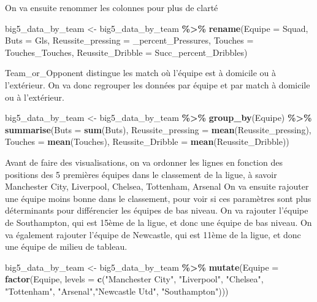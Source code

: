 \documentclass[
]{article}
\newenvironment{Shaded}{\begin{snugshade}}{\end{snugshade}}
\newcommand{\AttributeTok}[1]{\textcolor[rgb]{0.13,0.29,0.53}{#1}}
\newcommand{\FunctionTok}[1]{\textcolor[rgb]{0.13,0.29,0.53}{\textbf{#1}}}
\newcommand{\NormalTok}[1]{#1}
\newcommand{\OtherTok}[1]{\textcolor[rgb]{0.56,0.35,0.01}{#1}}
\newcommand{\SpecialCharTok}[1]{\textcolor[rgb]{0.81,0.36,0.00}{\textbf{#1}}}
\newcommand{\StringTok}[1]{\textcolor[rgb]{0.31,0.60,0.02}{#1}}
\begin{document}
On va ensuite renommer les colonnes pour plus de clarté

\begin{Shaded}
\begin{Highlighting}[]
\NormalTok{big5\_data\_by\_team }\OtherTok{\textless{}{-}}\NormalTok{ big5\_data\_by\_team }\SpecialCharTok{\%\textgreater{}\%} \FunctionTok{rename}\NormalTok{(}\AttributeTok{Equipe =}\NormalTok{ Squad, }\AttributeTok{Buts =}\NormalTok{ Gls, }\AttributeTok{Reussite\_pressing =} \StringTok{\textquotesingle{}\_percent\_Pressures\textquotesingle{}}\NormalTok{, }\AttributeTok{Touches =}\NormalTok{ Touches\_Touches, }\AttributeTok{Reussite\_Dribble =}\NormalTok{ Succ\_percent\_Dribbles)}
\end{Highlighting}
\end{Shaded}

Team\_or\_Opponent distingue les match où l'équipe est à domicile ou à
l'extérieur. On va donc regrouper les données par équipe et par match à
domicile ou à l'extérieur.

\begin{Shaded}
\begin{Highlighting}[]
\NormalTok{big5\_data\_by\_team }\OtherTok{\textless{}{-}}\NormalTok{ big5\_data\_by\_team }\SpecialCharTok{\%\textgreater{}\%} \FunctionTok{group\_by}\NormalTok{(Equipe) }\SpecialCharTok{\%\textgreater{}\%} \FunctionTok{summarise}\NormalTok{(}\AttributeTok{Buts =} \FunctionTok{sum}\NormalTok{(Buts), }\AttributeTok{Reussite\_pressing =} \FunctionTok{mean}\NormalTok{(Reussite\_pressing), }\AttributeTok{Touches =} \FunctionTok{mean}\NormalTok{(Touches), }\AttributeTok{Reussite\_Dribble =} \FunctionTok{mean}\NormalTok{(Reussite\_Dribble))}
\end{Highlighting}
\end{Shaded}

Avant de faire des visualisations, on va ordonner les lignes en fonction
des positions des 5 premières équipes dans le classement de la ligue, à
savoir Manchester City, Liverpool, Chelsea, Tottenham, Arsenal On va
ensuite rajouter une équipe moins bonne dans le classement, pour voir si
ces paramètres sont plus déterminants pour différencier les équipes de
bas niveau. On va rajouter l'équipe de Southampton, qui est 15ème de la
ligue, et donc une équipe de bas niveau. On va également rajouter
l'équipe de Newcastle, qui est 11ème de la ligue, et donc une équipe de
milieu de tableau.

\begin{Shaded}
\begin{Highlighting}[]
\NormalTok{big5\_data\_by\_team }\OtherTok{\textless{}{-}}\NormalTok{ big5\_data\_by\_team }\SpecialCharTok{\%\textgreater{}\%} \FunctionTok{mutate}\NormalTok{(}\AttributeTok{Equipe =} \FunctionTok{factor}\NormalTok{(Equipe, }\AttributeTok{levels =} \FunctionTok{c}\NormalTok{(}\StringTok{"Manchester City"}\NormalTok{, }\StringTok{"Liverpool"}\NormalTok{, }\StringTok{"Chelsea"}\NormalTok{, }\StringTok{"Tottenham"}\NormalTok{, }\StringTok{"Arsenal"}\NormalTok{,}\StringTok{"Newcastle Utd"}\NormalTok{, }\StringTok{"Southampton"}\NormalTok{)))}
\end{Highlighting}
\end{Shaded}
\end{document}
